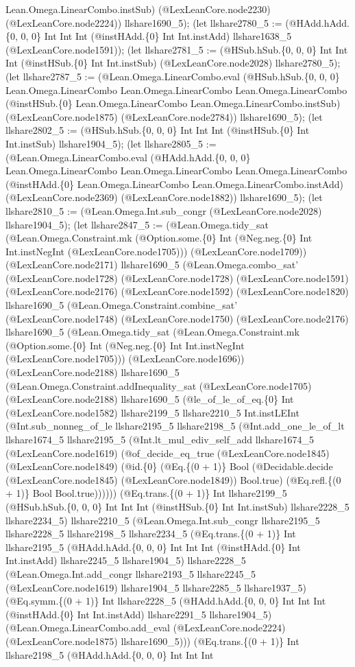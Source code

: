 \documentclass[11pt]{article}
\begin{document}
Lean.Omega.LinearCombo.instSub) (@LexLeanCore.node2230) (@LexLeanCore.node2224)) llshare1690\_5); (let llshare2780\_5 := (@HAdd.hAdd.\{0, 0, 0\} Int Int Int (@instHAdd.\{0\} Int Int.instAdd) llshare1638\_5 (@LexLeanCore.node1591)); (let llshare2781\_5 := (@HSub.hSub.\{0, 0, 0\} Int Int Int (@instHSub.\{0\} Int Int.instSub) (@LexLeanCore.node2028) llshare2780\_5); (let llshare2787\_5 := (@Lean.Omega.LinearCombo.eval (@HSub.hSub.\{0, 0, 0\} Lean.Omega.LinearCombo Lean.Omega.LinearCombo Lean.Omega.LinearCombo (@instHSub.\{0\} Lean.Omega.LinearCombo Lean.Omega.LinearCombo.instSub) (@LexLeanCore.node1875) (@LexLeanCore.node2784)) llshare1690\_5); (let llshare2802\_5 := (@HSub.hSub.\{0, 0, 0\} Int Int Int (@instHSub.\{0\} Int Int.instSub) llshare1904\_5); (let llshare2805\_5 := (@Lean.Omega.LinearCombo.eval (@HAdd.hAdd.\{0, 0, 0\} Lean.Omega.LinearCombo Lean.Omega.LinearCombo Lean.Omega.LinearCombo (@instHAdd.\{0\} Lean.Omega.LinearCombo Lean.Omega.LinearCombo.instAdd) (@LexLeanCore.node2369) (@LexLeanCore.node1882)) llshare1690\_5); (let llshare2810\_5 := (@Lean.Omega.Int.sub\_congr (@LexLeanCore.node2028) llshare1904\_5); (let llshare2847\_5 := (@Lean.Omega.tidy\_sat (@Lean.Omega.Constraint.mk (@Option.some.\{0\} Int (@Neg.neg.\{0\} Int Int.instNegInt (@LexLeanCore.node1705))) (@LexLeanCore.node1709)) (@LexLeanCore.node2171) llshare1690\_5 (@Lean.Omega.combo\_sat' (@LexLeanCore.node1728) (@LexLeanCore.node1728) (@LexLeanCore.node1591) (@LexLeanCore.node2176) (@LexLeanCore.node1592) (@LexLeanCore.node1820) llshare1690\_5 (@Lean.Omega.Constraint.combine\_sat' (@LexLeanCore.node1748) (@LexLeanCore.node1750) (@LexLeanCore.node2176) llshare1690\_5 (@Lean.Omega.tidy\_sat (@Lean.Omega.Constraint.mk (@Option.some.\{0\} Int (@Neg.neg.\{0\} Int Int.instNegInt (@LexLeanCore.node1705))) (@LexLeanCore.node1696)) (@LexLeanCore.node2188) llshare1690\_5 (@Lean.Omega.Constraint.addInequality\_sat (@LexLeanCore.node1705) (@LexLeanCore.node2188) llshare1690\_5 (@le\_of\_le\_of\_eq.\{0\} Int (@LexLeanCore.node1582) llshare2199\_5 llshare2210\_5 Int.instLEInt (@Int.sub\_nonneg\_of\_le llshare2195\_5 llshare2198\_5 (@Int.add\_one\_le\_of\_lt llshare1674\_5 llshare2195\_5 (@Int.lt\_mul\_ediv\_self\_add llshare1674\_5 (@LexLeanCore.node1619) (@of\_decide\_eq\_true (@LexLeanCore.node1845) (@LexLeanCore.node1849) (@id.\{0\} (@Eq.\{(0 + 1)\} Bool (@Decidable.decide (@LexLeanCore.node1845) (@LexLeanCore.node1849)) Bool.true) (@Eq.refl.\{(0 + 1)\} Bool Bool.true)))))) (@Eq.trans.\{(0 + 1)\} Int llshare2199\_5 (@HSub.hSub.\{0, 0, 0\} Int Int Int (@instHSub.\{0\} Int Int.instSub) llshare2228\_5 llshare2234\_5) llshare2210\_5 (@Lean.Omega.Int.sub\_congr llshare2195\_5 llshare2228\_5 llshare2198\_5 llshare2234\_5 (@Eq.trans.\{(0 + 1)\} Int llshare2195\_5 (@HAdd.hAdd.\{0, 0, 0\} Int Int Int (@instHAdd.\{0\} Int Int.instAdd) llshare2245\_5 llshare1904\_5) llshare2228\_5 (@Lean.Omega.Int.add\_congr llshare2193\_5 llshare2245\_5 (@LexLeanCore.node1619) llshare1904\_5 llshare2285\_5 llshare1937\_5) (@Eq.symm.\{(0 + 1)\} Int llshare2228\_5 (@HAdd.hAdd.\{0, 0, 0\} Int Int Int (@instHAdd.\{0\} Int Int.instAdd) llshare2291\_5 llshare1904\_5) (@Lean.Omega.LinearCombo.add\_eval (@LexLeanCore.node2224) (@LexLeanCore.node1875) llshare1690\_5))) (@Eq.trans.\{(0 + 1)\} Int llshare2198\_5 (@HAdd.hAdd.\{0, 0, 0\} Int Int Int 
\end{document}
